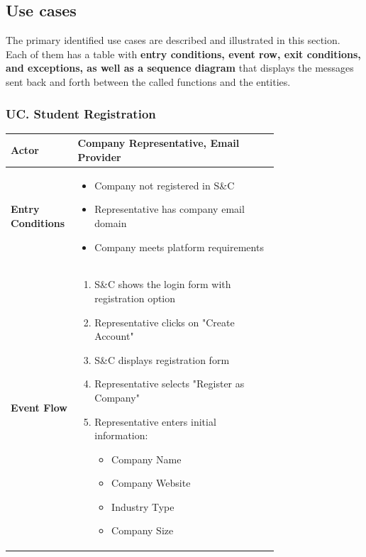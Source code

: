 \subsection{Use cases}
\label{subsec: use_cases}%
\setcounter{uc}{1}
\newcommand{\cuc}{\theuc\stepcounter{uc}}
The primary identified use cases are described and illustrated in this section.
Each of them has a table with \textbf{entry conditions, event row, exit conditions, and exceptions, as well as a sequence diagram} that displays the messages sent back and forth between the called functions and the entities.

\subsubsection*{UC\cuc . Student Registration}
\begin{center}
    \begin{longtable}{|l|p{0.75\linewidth}|}
        \hline
        \textbf{Actor}            & Company Representative, Email Provider \\
        \hline
        \textbf{Entry Conditions} & 
        \begin{itemize}
            \item Company not registered in S\&C
            \item Representative has company email domain
            \item Company meets platform requirements
        \end{itemize} \\
        \hline
        \textbf{Event Flow}       & 
        \begin{enumerate}
            \item S\&C shows the login form with registration option
            \item Representative clicks on "Create Account"
            \item S\&C displays registration form
            \item Representative selects "Register as Company"
            \item Representative enters initial information:
            \begin{itemize}
                \item Company Name
                \item Company Website
                \item Industry Type
                \item Company Size

\end{itemize}
\end{enumerate}
\end{longtable}
\end{center}
